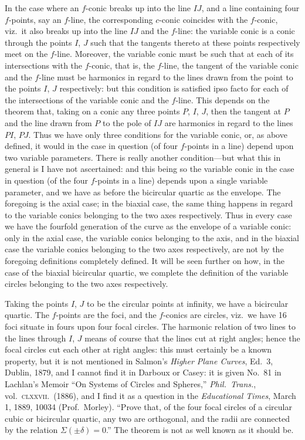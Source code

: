 \documentclass[11pt,a4paper]{article}
\begin{document}
\smallskip
In the case where an $f$-conic breaks up into the line $IJ$, and a line containing four $f$-points, say an $f$-line, the corresponding $c$-conic coincides with the $f$-conic, viz.\ it also breaks up into the line $IJ$ and the $f$-line: the variable conic is a conic through the points $I$, $J$ such that the tangents thereto at these points respectively meet on the $f$-line. Moreover, the variable conic must be such that at each of its intersections with the $f$-conic, that is, the $f$-line, the tangent of the variable conic and the $f$-line must be harmonics in regard to the lines drawn from the point to the points $I$, $J$ respectively: but this condition is satisfied ipso facto for each of the intersections of the variable conic and the $f$-line. This depends on the theorem that, taking on a conic any three points $P$, $I$, $J$, then the tangent at $P$ and the line drawn from $P$ to the pole of $IJ$ are harmonics in regard to the lines $PI$, $PJ$. Thus we have only three conditions for the variable conic, or, as above defined, it would in the case in question (of four $f$-points in a line) depend upon two variable parameters. There is really another condition---but what this in general is I have not ascertained: and this being so the variable conic in the case in question (of the four $f$-points in a line) depends upon a single variable parameter, and we have as before the bicircular quartic as the envelope. The foregoing is the axial case; in the biaxial case, the same thing happens in regard to the variable conics belonging to the two axes respectively. Thus in every case we have the fourfold generation of the curve as the envelope of a variable conic: only in the axial case, the variable conics belonging to the axis, and in the biaxial case the variable conics belonging to the two axes respectively, are not by the foregoing definitions completely defined. It will be seen further on how, in the case of the biaxial bicircular quartic, we complete the definition of the variable circles belonging to the two axes respectively.

\smallskip
Taking the points $I$, $J$ to be the circular points at infinity, we have a bicircular quartic. The $f$-points are the foci, and the $f$-conics are circles, viz.\ we have 16 foci situate in fours upon four focal circles. The harmonic relation of two lines to the lines through $I$, $J$ means of course that the lines cut at right angles; hence the focal circles cut each other at right angles: this must certainly be a known property, but it is not mentioned in Salmon's \emph{Higher Plane Curves}, Ed.\ 3, Dublin, 1879, and I cannot find it in Darboux or Casey: it is given No.\ 81 in Lachlan's Memoir ``On Systems of Circles and Spheres,'' \emph{Phil.\ Trans.}, vol.\ \textsc{clxxvii}.\ (1886), and I find it as a question in the \emph{Educational Times}, March 1, 1889, 10034 (Prof.\ Morley). ``Prove that, of the four focal circles of a circular cubic or bicircular quartic, any two are orthogonal, and the radii are connected by the relation $\Sigma(\pm \delta) = 0$.'' The theorem is not as well known as it should be.
\end{document}
